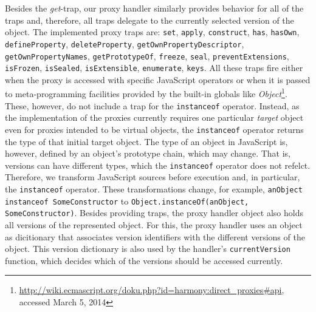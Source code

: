 Besides the \emph{get}-trap, our proxy handler similarly provides behavior for all of the traps and, therefore, all traps delegate to the currently selected version of the object.
The implemented proxy traps are: \lstinline{set}, \lstinline{apply}, \lstinline{construct}, \lstinline{has}, \lstinline{hasOwn}, \lstinline{defineProperty}, \lstinline{deleteProperty}, \lstinline{getOwnPropertyDescriptor}, \lstinline{getOwnPropertyNames}, \lstinline{getPrototypeOf}, \lstinline{freeze}, \lstinline{seal}, \lstinline{preventExtensions}, \lstinline{isFrozen}, \lstinline{isSealed}, \lstinline{isExtensible}, \lstinline{enumerate}, \lstinline{keys}.
All these traps fire either when the proxy is accessed with specific JavaScript operators or when it is passed to meta-programming facilities provided by the built-in globals like \emph{Object}\footnote{\url{http://wiki.ecmascript.org/doku.php?id=harmony:direct_proxies\#api}, accessed March 5, 2014}.
These, however, do not include a trap for the \lstinline{instanceof} operator.
Instead, as the implementation of the proxies currently requires one particular \emph{target} object even for proxies intended to be virtual objects, the \lstinline{instanceof} operator returns the type of that initial target object.
The type of an object in JavaScript is, however, defined by an object's prototype chain, which may change.
That is, versions can have different types, which the \lstinline{instanceof} operator does not refelct.
Therefore, we transform JavaScript sources before execution and, in particular, the \lstinline{instanceof} operator.
These transformations change, for example, \lstinline{anObject instanceof SomeConstructor} to \lstinline{Object.instanceOf(anObject, SomeConstructor)}.
Besides providing traps, the proxy handler object also holds all versions of the represented object.
For this, the proxy handler uses an object as dicitionary that associates version identifiers with the different versions of the object.
This version dictionary is also used by the handler's \lstinline{currentVersion} function, which decides which of the versions should be accessed currently.

